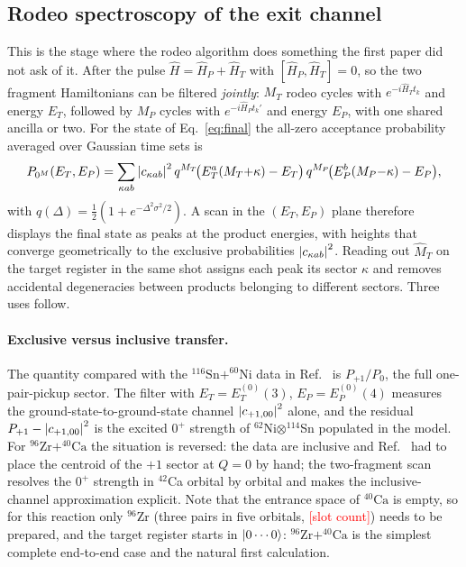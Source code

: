 \documentclass[
  aps,
  prc,
  reprint,
  superscriptaddress,
  floatfix,
  nofootinbib
]{revtex4-2}
\newcommand{\todo}[1]{\textcolor{red}{[#1]}}
\newcommand{\HP}{\hat H_{P}}
\newcommand{\HT}{\hat H_{T}}
\newcommand{\Sn}{^{116}\mathrm{Sn}}
\newcommand{\Ni}{^{60}\mathrm{Ni}}
\newcommand{\Zr}{^{96}\mathrm{Zr}}
\newcommand{\Ca}{^{40}\mathrm{Ca}}
\begin{document}
\subsection{Rodeo spectroscopy of the exit channel}
\label{sec:rodeo-exit}
This is the stage where the rodeo algorithm does something the first paper
did not ask of it.  After the pulse $\hat H=\HP+\HT$ with $[\HP,\HT]=0$, so
the two fragment Hamiltonians can be filtered \emph{jointly}: $M_T$ rodeo
cycles with $e^{-i\HT t_k}$ and energy $E_T$, followed by $M_P$ cycles with
$e^{-i\HP t_k'}$ and energy $E_P$, with one shared ancilla or two.  For the
state of Eq.~\eqref{eq:final} the all-zero acceptance probability averaged
over Gaussian time sets is
\begin{equation}
  P_{0^{M}}(E_T,E_P)=\sum_{\kappa ab}\abs{c_{\kappa ab}}^2\,
  q^{M_T}\!\big(E^{a}_{T}(M_T{+}\kappa)-E_T\big)\,
  q^{M_P}\!\big(E^{b}_{P}(M_P{-}\kappa)-E_P\big),
  \label{eq:scan2d}
\end{equation}
with $q(\Delta)=\tfrac12(1+e^{-\Delta^2\sigma^2/2})$.  A scan in the
$(E_T,E_P)$ plane therefore displays the final state as peaks at the
product energies, with heights that converge geometrically to the
exclusive probabilities $\abs{c_{\kappa ab}}^2$.  Reading out $\hat M_T$ on
the target register in the same shot assigns each peak its sector $\kappa$
and removes accidental degeneracies between products belonging to
different sectors.  Three uses follow.

\paragraph{Exclusive versus inclusive transfer.}
The quantity compared with the $\Sn+\Ni$ data in Ref.~\cite{TwoFragment2026}
is $P_{+1}/P_0$, the full one-pair-pickup sector.  The filter with
$E_T=E^{(0)}_T(3)$, $E_P=E^{(0)}_P(4)$ measures the ground-state-to-ground-state
channel $\abs{c_{+1,00}}^2$ alone, and the residual
$P_{+1}-\abs{c_{+1,00}}^2$ is the excited $0^+$ strength of
$^{62}$Ni$\otimes{}^{114}$Sn populated in the model.  For $\Zr+\Ca$ the
situation is reversed: the data are inclusive and
Ref.~\cite{TwoFragment2026} had to place the centroid of the $+1$ sector at
$Q=0$ by hand; the two-fragment scan resolves the $0^+$ strength in
$^{42}$Ca orbital by orbital and makes the inclusive-channel approximation
explicit.  Note that the entrance space of $\Ca$ is empty, so for this
reaction only $\Zr$ (three pairs in five orbitals, \todo{slot count})
needs to be prepared, and the target register starts in
$\ket{0\cdots0}$: $\Zr+\Ca$ is the simplest complete end-to-end case and
the natural first calculation.
\end{document}
